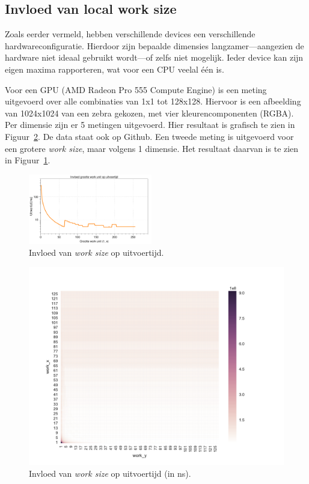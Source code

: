 \documentclass[twocolumn, a4paper]{article}
\begin{document}
\subsection{Invloed van local work size}
Zoals eerder vermeld, hebben verschillende devices een verschillende hardwareconfiguratie. Hierdoor zijn bepaalde dimensies langzamer---aangezien de hardware niet ideaal gebruikt wordt---of zelfs niet mogelijk. Ieder device kan zijn eigen maxima rapporteren, wat voor een CPU veelal één is.

Voor een GPU (AMD Radeon Pro 555 Compute Engine) is een meting uitgevoerd over alle combinaties van 1x1 tot 128x128. Hiervoor is een afbeelding van 1024x1024 van een zebra gekozen, met vier kleurencomponenten (RGBA). Per dimensie zijn er 5 metingen uitgevoerd. Hier resultaat is grafisch te zien in Figuur~\ref{fig:output-all}. De data staat ook op Github. Een tweede meting is uitgevoerd voor een grotere \emph{work size}, maar volgens 1 dimensie. Het resultaat daarvan is te zien in Figuur~\ref{fig:output-one}.

\begin{figure}
    \centering
    \includegraphics[width=0.48\textwidth]{data/execution-time.png}
    \caption{Invloed van \emph{work size} op uitvoertijd.}\label{fig:output-one}
\end{figure}

\begin{figure}
    \centering
    \includegraphics[width=1.1\textwidth]{data/output_powers.pdf}
    \caption{Invloed van \emph{work size} op uitvoertijd (in ns).}\label{fig:output-all}
\end{figure}
\end{document}
